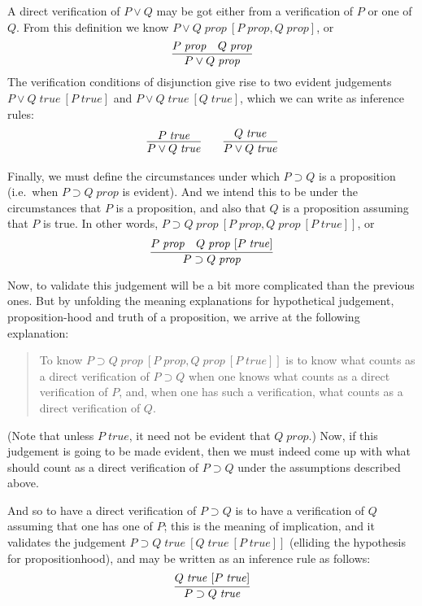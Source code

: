 \documentclass{amsart}
\theoremstyle{definition}
\theoremstyle{remark}
\numberwithin{equation}{section}
\newcommand\isprop[1]{\ensuremath{#1\;\mathit{prop}}}
\newcommand\istrue[1]{\ensuremath{#1\;\mathit{true}}}
\newcommand\hyp[2]{\ensuremath{#1\ [#2]}}
\begin{document}
A direct verification of $P\lor Q$ may be got either from a verification
of $P$ or one of $Q$. From this definition we know \hyp{\isprop{P\lor
Q}}{\isprop{P},\isprop{Q}}, or
\[
  \infer{
    \isprop{P\lor Q}
  }{
    \isprop{P} &
    \isprop{Q}
  }
\]
The verification conditions of disjunction give
rise to two evident judgements \hyp{\istrue{P\lor Q}}{\istrue{P}} and
\hyp{\istrue{P\lor Q}}{\istrue{Q}}, which we can write as inference rules:
\begin{gather*}
  \infer{
    \istrue{P\lor Q}
  }{
    \istrue{P}
  }
  \qquad
  \infer{
    \istrue{P\lor Q}
  }{
    \istrue{Q}
  }
\end{gather*}

Finally, we must define the circumstances under which $P\supset Q$ is a
proposition (i.e.\ when \isprop{P\supset Q} is evident). And we intend this to
be under the circumstances that $P$ is a proposition, and also that $Q$ is a
proposition assuming that $P$ is true. In other words, \hyp{\isprop{P\supset
Q}}{\isprop{P}, \hyp{\isprop{Q}}{\istrue{P}}}, or
\[
  \infer{
    \isprop{P\supset Q}
  }{
    \isprop{P} &
    \hyp{\isprop{Q}}{\istrue{P}}
  }
\]

Now, to validate this judgement will be a bit more complicated than the
previous ones. But by unfolding the meaning explanations for hypothetical
judgement, proposition-hood and truth of a proposition, we arrive at the
following explanation:
\begin{quote}
  To know \hyp{\isprop{P\supset Q}}{\isprop{P},\hyp{\isprop{Q}}{\istrue{P}}} is
  to know what counts as a direct verification of $P\supset Q$ when one knows what
  counts as a direct verification of $P$, and, when one has such a verification, what
  counts as a direct verification of $Q$.
\end{quote}

(Note that unless \istrue{P}, it need not be evident that \isprop{Q}.) Now, if
this judgement is going to be made evident, then we must indeed come up with
what should count as a direct verification of $P\supset Q$ under the
assumptions described above.

And so to have a direct verification of $P\supset Q$ is to have a
verification of $Q$ assuming that one has one of $P$; this is the meaning of
implication, and it validates the judgement \hyp{\istrue{P\supset
Q}}{\hyp{\istrue{Q}}{\istrue{P}}} (elliding the hypothesis for
propositionhood), and may be written as an inference rule as follows:
\[
  \infer{
    \istrue{P\supset Q}
  }{
    \hyp{\istrue{Q}}{\istrue{P}}
  }
\]
\end{document}
